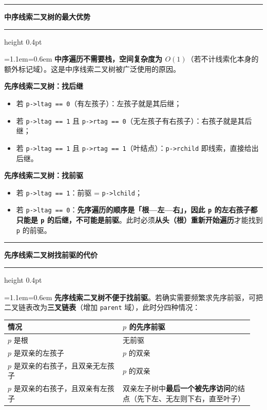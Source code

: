 \documentclass[11pt,openany,UTF8]{ctexbook}
\newcommand{\callouthead}[2]{%
  \par\addvspace{7pt}\noindent
  {\color{#1}\rule[-0.15em]{3pt}{1.05em}}\hspace{0.5em}%
  {\bfseries\color{#1}#2}\par\nobreak\vspace{-0.35em}%
  {\color{rulesep}\hrule height 0.4pt}\nobreak\vspace{0.45em}%
  \begingroup\small\setlength{\parindent}{0pt}%
  \leftskip=1.1em\rightskip=0.6em\noindent\ignorespaces}
\newcommand{\calloutend}{\par\endgroup\addvspace{7pt}}
\newenvironment{callkey}[1]{\callouthead{keybar}{#1}}{\calloutend}
\newenvironment{callwarn}[1]{\callouthead{warnbar}{#1}}{\calloutend}
\begin{document}
\begin{callkey}{中序线索二叉树的最大优势}
\textbf{中序遍历不需要栈，空间复杂度为 $O(1)$}（若不计线索化本身的额外标记域）。这是中序线索二叉树被广泛使用的原因。

\end{callkey}

\textbf{先序线索二叉树：找后继}

\begin{itemize}
\item 若 \texttt{p->\allowbreak{}ltag =\allowbreak{}=\allowbreak{} 0}（有左孩子）：左孩子就是其后继；
\item 若 \texttt{p->\allowbreak{}ltag =\allowbreak{}=\allowbreak{} 1} 且 \texttt{p->\allowbreak{}rtag =\allowbreak{}=\allowbreak{} 0}（无左孩子有右孩子）：右孩子就是其后继；
\item 若 \texttt{p->\allowbreak{}ltag =\allowbreak{}=\allowbreak{} 1} 且 \texttt{p->\allowbreak{}rtag =\allowbreak{}=\allowbreak{} 1}（叶结点）：\texttt{p->\allowbreak{}rchild} 即线索，直接给出后继。
\end{itemize}
\textbf{先序线索二叉树：找前驱}

\begin{itemize}
\item 若 \texttt{p->\allowbreak{}ltag =\allowbreak{}=\allowbreak{} 1}：前驱 = \texttt{p->\allowbreak{}lchild}；
\item 若 \texttt{p->\allowbreak{}ltag =\allowbreak{}=\allowbreak{} 0}：\textbf{先序遍历的顺序是「根—左—右」，因此 \texttt{p} 的左右孩子都只能是 \texttt{p} 的后继，不可能是前驱}。此时必须\textbf{从头（根）重新开始遍历}才能找到 \texttt{p} 的前驱。
\end{itemize}
\begin{callwarn}{先序线索二叉树找前驱的代价}
\textbf{先序线索二叉树不便于找前驱}。若确实需要频繁求先序前驱，可把二叉链表改为\textbf{三叉链表}（增加 \texttt{parent} 域），此时分四种情况：

\begingroup\small\setlength{\tabcolsep}{4.0pt}
\begin{longtable}{@{}L{0.4444\linewidth}L{0.5013\linewidth}@{}}
\toprule
\textbf{情况} & \textbf{$p$ 的先序前驱} \\
\midrule
\endhead
$p$ 是根 & 无前驱 \\
$p$ 是双亲的左孩子 & $p$ 的双亲 \\
$p$ 是双亲的右孩子，且双亲无左孩子 & $p$ 的双亲 \\
$p$ 是双亲的右孩子，且双亲有左孩子 & 双亲左子树中\textbf{最后一个被先序访问}的结点（先下左、无左则下右，直至叶子） \\
\bottomrule
\end{longtable}
\endgroup

\end{callwarn}
\end{document}
